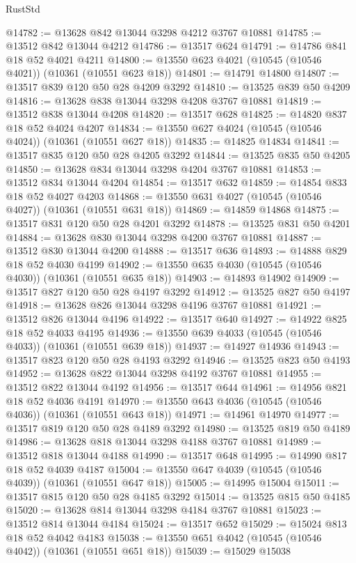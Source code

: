 \begin{lexlean}{RustStd}
\begin{coremodule}
@14782 := @13628 @842 @13044 @3298 @4212 @3767 @10881
@14785 := @13512 @842 @13044 @4212
@14786 := @13517 @624
@14791 := @14786 @841 @18 @52 @4021 @4211
@14800 := @13550 @623 @4021 (@10545 (@10546 @4021)) (@10361 (@10551 @623 @18))
@14801 := @14791 @14800
@14807 := @13517 @839 @120 @50 @28 @4209 @3292
@14810 := @13525 @839 @50 @4209
@14816 := @13628 @838 @13044 @3298 @4208 @3767 @10881
@14819 := @13512 @838 @13044 @4208
@14820 := @13517 @628
@14825 := @14820 @837 @18 @52 @4024 @4207
@14834 := @13550 @627 @4024 (@10545 (@10546 @4024)) (@10361 (@10551 @627 @18))
@14835 := @14825 @14834
@14841 := @13517 @835 @120 @50 @28 @4205 @3292
@14844 := @13525 @835 @50 @4205
@14850 := @13628 @834 @13044 @3298 @4204 @3767 @10881
@14853 := @13512 @834 @13044 @4204
@14854 := @13517 @632
@14859 := @14854 @833 @18 @52 @4027 @4203
@14868 := @13550 @631 @4027 (@10545 (@10546 @4027)) (@10361 (@10551 @631 @18))
@14869 := @14859 @14868
@14875 := @13517 @831 @120 @50 @28 @4201 @3292
@14878 := @13525 @831 @50 @4201
@14884 := @13628 @830 @13044 @3298 @4200 @3767 @10881
@14887 := @13512 @830 @13044 @4200
@14888 := @13517 @636
@14893 := @14888 @829 @18 @52 @4030 @4199
@14902 := @13550 @635 @4030 (@10545 (@10546 @4030)) (@10361 (@10551 @635 @18))
@14903 := @14893 @14902
@14909 := @13517 @827 @120 @50 @28 @4197 @3292
@14912 := @13525 @827 @50 @4197
@14918 := @13628 @826 @13044 @3298 @4196 @3767 @10881
@14921 := @13512 @826 @13044 @4196
@14922 := @13517 @640
@14927 := @14922 @825 @18 @52 @4033 @4195
@14936 := @13550 @639 @4033 (@10545 (@10546 @4033)) (@10361 (@10551 @639 @18))
@14937 := @14927 @14936
@14943 := @13517 @823 @120 @50 @28 @4193 @3292
@14946 := @13525 @823 @50 @4193
@14952 := @13628 @822 @13044 @3298 @4192 @3767 @10881
@14955 := @13512 @822 @13044 @4192
@14956 := @13517 @644
@14961 := @14956 @821 @18 @52 @4036 @4191
@14970 := @13550 @643 @4036 (@10545 (@10546 @4036)) (@10361 (@10551 @643 @18))
@14971 := @14961 @14970
@14977 := @13517 @819 @120 @50 @28 @4189 @3292
@14980 := @13525 @819 @50 @4189
@14986 := @13628 @818 @13044 @3298 @4188 @3767 @10881
@14989 := @13512 @818 @13044 @4188
@14990 := @13517 @648
@14995 := @14990 @817 @18 @52 @4039 @4187
@15004 := @13550 @647 @4039 (@10545 (@10546 @4039)) (@10361 (@10551 @647 @18))
@15005 := @14995 @15004
@15011 := @13517 @815 @120 @50 @28 @4185 @3292
@15014 := @13525 @815 @50 @4185
@15020 := @13628 @814 @13044 @3298 @4184 @3767 @10881
@15023 := @13512 @814 @13044 @4184
@15024 := @13517 @652
@15029 := @15024 @813 @18 @52 @4042 @4183
@15038 := @13550 @651 @4042 (@10545 (@10546 @4042)) (@10361 (@10551 @651 @18))
@15039 := @15029 @15038

\end{coremodule}
\end{lexlean}

